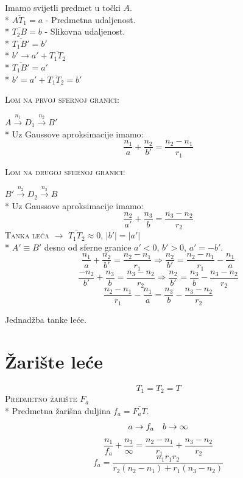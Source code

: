 \documentclass{report}
\begin{document}
Imamo svijetli predmet u točki $A$.\\*
$\overline{AT_1} = a$ - Predmetna udaljenost.\\*
$\overline{T_2B} = b$ - Slikovna udaljenost.\\*
$\overline{T_1B'} = b'$\\*
$b' \to a' + \overline{T_1 T_2}$\\*
$\overline{T_1B'} = a'$\\*
$b' = a' + \overline{T_1 T_2} = b'$

\textsc{Lom na prvoj sfernoj granici:}

$A\xrightarrow{{n_1 }}D_1 \xrightarrow{{n_2 }}B'$\\*
Uz Gaussove aproksimacije imamo:
$$\frac{n_1}{a} + \frac{n_2}{b'} = \frac{n_2 - n_1}{r_1}$$

\textsc{Lom na drugoj sfernoj granici:}

$B'\xrightarrow{{n_2 }}D_2 \xrightarrow{{n_3 }}B$\\*
Uz Gaussove aproksimacije imamo:
$$\frac{n_2}{a'} + \frac{n_3}{b} = \frac{n_3 - n_2}{r_2}$$
\textsc{Tanka leća} $\rightarrow $ $\overline{T_1 T_2} \approx 0$, $\left| {b'} \right| = \left| {a'} \right|$\\*
$A' \equiv B'$ desno od sferne granice $a' < 0$, $b' > 0$, $a' = -b'$.
$$\frac{n_1}{a} + \frac{n_2}{b'} = \frac{n_2 - n_1}{r_1} \Rightarrow \frac{n_2}{b'} = \frac{n_2 - n_1}{r_1} - \frac{n_1}{a}$$
$$\frac{-n_2}{b'} + \frac{n_3}{b} = \frac{n_3 - n_2}{r_2} \Rightarrow \frac{n_2}{b'} = \frac{n_3}{b} - \frac{n_3 - n_2}{r_2}$$
$$\frac{n_2 - n_1}{r_1} - \frac{n_1}{a} = \frac{n_3}{b} - \frac{n_3 - n_2}{r_2}$$
\begin{center}
\end{center}
Jednadžba tanke leće.

\section{Žarište leće}

$$T_1 = T_2 = T$$
\textsc{Predmetno žarište} $F_a$\\*
Predmetna žarišna duljina $f_a = \overline{F_a T}$.
$$\begin{array}{*{20}c}
   {a \to f_a } & {b \to \infty }  \\

 \end{array} $$
$$\frac{n_1}{f_a} + \frac{n_3}{\infty} = \frac{n_2 - n_1}{r_1} + \frac{n_3 - n_2}{r_2}$$
$$f_a = \frac{n_1 r_1 r_2}{r_2 (n_2 - n_1) + r_1 (n_3 - n_2)}$$
\end{document}
